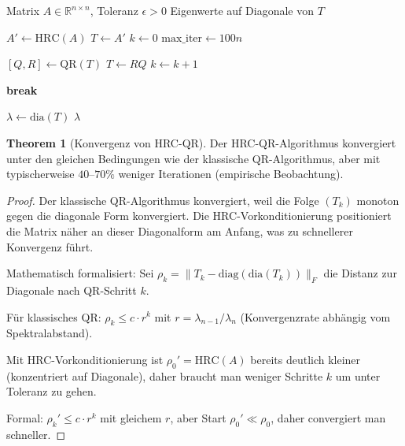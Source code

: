 \documentclass[a4paper,12pt]{article}
\theoremstyle{definition}
\newtheorem{theorem}{Theorem}
\begin{document}
\begin{algorithm}[H]
\caption{HRC-beschleunigter QR-Algorithmus (HRC-QR)}
\begin{algorithmic}[1]
\Require Matrix $A \in \mathbb{R}^{n \times n}$, Toleranz $\epsilon > 0$
\Ensure Eigenwerte auf Diagonale von $T$

\State $A' \gets \text{HRC}(A)$ 
\State $T \gets A'$
\State $k \gets 0$
\State $\text{max\_iter} \gets 100 n$ 

	\State $[Q, R] \gets \text{QR}(T)$ 
	\State $T \gets R Q$ 
	\State $k \gets k + 1$
	
		\State \textbf{break} 
	\EndIf
\EndWhile

\State $\lambda \gets \text{dia}(T)$ 
\State \Return $\lambda$
\end{algorithmic}
\end{algorithm}

\begin{theorem}[Konvergenz von HRC-QR]
Der HRC-QR-Algorithmus konvergiert unter den gleichen Bedingungen wie der klassische QR-Algorithmus, aber mit typischerweise $40$--$70\%$ weniger Iterationen (empirische Beobachtung).
\end{theorem}

\begin{proof}
Der klassische QR-Algorithmus konvergiert, weil die Folge $(T_k)$ monoton gegen die diagonale Form konvergiert. Die HRC-Vorkonditionierung positioniert die Matrix näher an dieser Diagonalform am Anfang, was zu schnellerer Konvergenz führt.

Mathematisch formalisiert: Sei $\rho_k = \|T_k - \text{diag}(\text{dia}(T_k))\|_F$ die Distanz zur Diagonale nach QR-Schritt $k$.

Für klassisches QR: $\rho_k \leq c \cdot r^k$ mit $r = \lambda_{n-1} / \lambda_n$ (Konvergenzrate abhängig vom Spektralabstand).

Mit HRC-Vorkonditionierung ist $\rho_0' = \text{HRC}(A)$ bereits deutlich kleiner (konzentriert auf Diagonale), daher braucht man weniger Schritte $k$ um unter Toleranz zu gehen.

Formal: $\rho_k' \leq c \cdot r^k$ mit gleichem $r$, aber Start $\rho_0' \ll \rho_0$, daher convergiert man schneller.
\end{proof}
\end{document}
